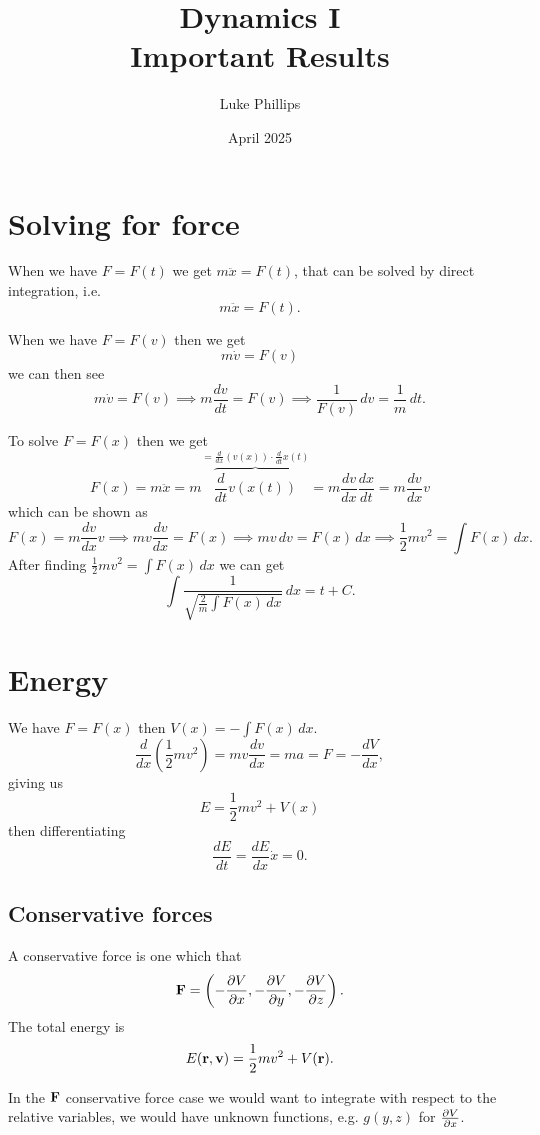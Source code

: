 \documentclass[10pt, a4paper]{article}
\title{Dynamics I \\
    \large Important Results}
\author{Luke Phillips}
\date{April 2025}
\begin{document}
\maketitle

\newpage

\tableofcontents

\newpage

\section{Solving for force}
When we have $F = F(t)$ we get $m\ddot{x} = F(t)$,
that can be solved by direct integration,
i.e.
\[
m\ddot{x} = F(t).
\]

When we have $F = F(v)$ then we get
\[
m\dot{v} = F(v)
\]
we can then see
\[
m\dot{v} = F(v) \implies m\frac{dv}{dt} = F(v) \implies \frac{1}{F(v)}\,dv = \frac{1}{m}\,dt.
\]

To solve $F = F(x)$ then we get
\[
F(x) =m\ddot{x} = m\overbrace{\frac{d}{dt}v(x(t))}^{= \frac{d}{dx}(v(x))\cdot\frac{d}{dt}x(t)} = m\frac{dv}{dx}\frac{dx}{dt} = m\frac{dv}{dx}v
\]
which can be shown as
\[
F(x) = m\frac{dv}{dx}v \implies mv\frac{dv}{dx} = F(x) \implies mv\,dv = F(x)\,dx \implies \frac{1}{2}mv ^ 2 = \int F(x)\,dx.
\]
After finding $\frac{1}{2}mv ^ 2 = \int F(x)\,dx$ we can get
\[
\int\frac{1}{\sqrt{\frac{2}{m}\int F(x)\,dx}}\,dx = t + C.
\]

\newpage

\section{Energy}
We have $F = F(x)$ then $V(x) = -\int F(x)\,dx$.
\[
\frac{d}{dx}\left(\frac{1}{2}mv ^ 2\right) = mv\frac{dv}{dx} = ma = F = -\frac{dV}{dx},
\]
giving us
\[
E = \frac{1}{2}mv ^ 2 + V(x)
\]
then differentiating
\[
\frac{dE}{dt} = \frac{dE}{dx}\dot{x} = 0.
\]

\subsection{Conservative forces}
A conservative force is one which that
\[
\mbf{F} = \left(-\pd[V]{x}, -\pd[V]{y}, -\pd[V]{z}\right).
\]
The total energy is
\[
E(\mbf{r}, \mbf{v}) = \frac{1}{2}mv ^ 2 + V(\mbf{r}).
\]

In the $\mbf{F}$ conservative force case we would want to integrate with respect to the relative variables,
we would have unknown functions,
e.g. $g(y, z)$ for $\pd[V]{x}$.

\newpage
\end{document}
